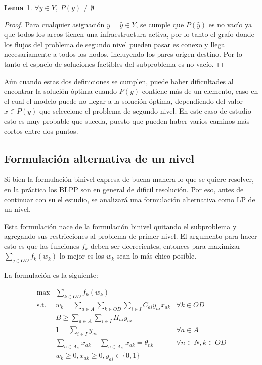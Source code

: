 \documentclass{article}
\newtheorem{lemma}{Lema}
\begin{document}
  \begin{lemma}$\forall y \in Y,\; P(y) \neq \emptyset$
  \end{lemma}

  \begin{proof}
    Para cualquier asignación $y = \hat{y} \in Y$, se cumple que $P(\hat{y})$ es no vacío ya que todos los arcos tienen una infraestructura activa, por lo tanto el grafo donde los flujos del problema de segundo nivel pueden pasar es conexo y llega necesariamente a todos los nodos, incluyendo los pares origen-destino. Por lo tanto el espacio de soluciones factibles del subproblema es no vacío. 
  \end{proof}

  Aún cuando estas dos definiciones se cumplen, puede haber dificultades al encontrar la solución óptima cuando $P(y)$ contiene más de un elemento, caso en el cual el modelo puede no llegar a la solución óptima, dependiendo del valor $x \in P(y)$ que seleccione el problema de segundo nivel. En este caso de estudio esto es muy probable que suceda, puesto que pueden haber varios caminos más cortos entre dos puntos.

  \subsection*{Formulación alternativa de un nivel}

  Si bien la formulación binivel expresa de buena manera lo que se quiere resolver, en la práctica los BLPP son en general de dificil resolución. Por eso, antes de continuar con su el estudio, se analizará una formulación alternativa como LP de un nivel.

  Esta formulación nace de la formulación binivel quitando el subproblema y agregando sus restricciones al problema de primer nivel. El argumento para hacer esto es que las funciones $f_k$ deben ser decrecientes, entonces para maximizar $\sum_{j \in OD}f_k(w_k)$ lo mejor es los $w_k$ sean lo más chico posible.

  La formulación es la siguiente:

  \begin{align}
    \text{max}    & \sum_{k \in OD} f_k(w_k)                                                         & \label{eq:objectivealt} \\
    \text{s.t.}\; & w_k = \sum_{a \in A} \sum_{k \in OD} \sum_{i \in I} C_{ai}y_{ai}x_{ak}           & \forall k \in OD \label{eq:shortestpathalt} \\
                  & B \geq \sum_{a \in A} \sum_{i \in I} H_{ai}y_{ai}                                & \label{eq:respectbudgetalt} \\
                  & 1 = \sum_{i \in I} y_{ai}                                                        & \forall a \in A \label{eq:alwaysoneyalt} \\
                  & \sum_{a \in A_n^+} x_{ak} - \sum_{a \in A_n^-} x_{ak} = \theta_{nk}              & \forall n \in N, k \in OD \label{eq:flowbalancealt} \\
                  & w_k \geq 0, x_{ak} \geq 0, y_{ai} \in \{0,1\}                                    & \nonumber
  \end{align}
\end{document}
